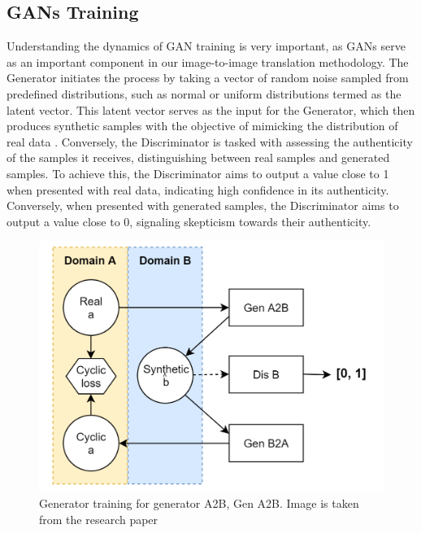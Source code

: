 \documentclass[UKenglish,12pt]{master-style}
\begin{document}
\subsection{GANs Training}

Understanding the dynamics of GAN training is very important, as GANs serve as an important component in our image-to-image translation methodology. The Generator initiates the process by taking a vector of random noise sampled from predefined distributions, such as normal or uniform distributions termed as the latent vector. This latent vector serves as the input for the Generator, which then produces synthetic samples  with the objective of mimicking the distribution of real data \cite{8784681} . Conversely, the Discriminator is tasked with assessing the authenticity of the samples it receives, distinguishing between real samples and generated samples. To achieve this, the Discriminator aims to output a value close to 1 when presented with real data, indicating high confidence in its authenticity. Conversely, when presented with generated samples, the Discriminator aims to output a value close to 0, signaling skepticism towards their authenticity.

\begin{figure}[ht]
    \centering
    \includegraphics[width=1\textwidth]{Images/Gen_Training.png}
    \caption{Generator training for generator A2B, Gen A2B. Image is taken from the research paper \cite{MRI}}
    \label{fig:Gen_Training}
\end{figure}
\end{document}
